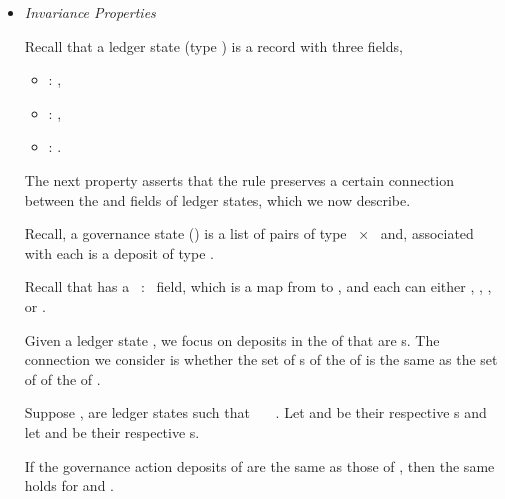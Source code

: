 \begin{itemize}
\item \textit{Invariance Properties}

        Recall that a ledger state (type \LState{}) is a record with three fields,
        \begin{itemize}
          \item[]  : \UTxOState{},
          \item[]  : \GovState{},
          \item[]  : \CertState{}.
        \end{itemize}
        The next property asserts that the  rule preserves a
        certain connection between the  and  fields of ledger
        states, which we now describe.

        Recall, a governance state (\GovState{}) is a list of pairs of type
        \GovActionID{}~×~\GovActionState{} and, associated with each
        \GovActionID{} is a deposit of type \GovActionDeposit{}.

        Recall that \UTxOState{} has a ~:~\Deposits{} field, which is a map
        from \DepositPurpose{} to \Coin{}, and each \DepositPurpose{} can either
        \CredentialDeposit{}, \PoolDeposit{}, \DRepDeposit{}, or \GovActionDeposit{}.

        Given a ledger state , we focus on deposits in the
        \UTxOState{} of  that are \GovActionDeposit{}s.  The connection we
        consider is whether the set of \GovActionDeposit{}s of the
        \UTxOState{} of  is the same as the set of \GovActionDeposit{} of the \GovState{}
        of .

  \begin{property}

  Suppose ,  are ledger states such that
   ~~~. Let 
  and  be their respective \UTxOState{}s and let 
  and  be their respective \GovState{}s.

  If the governance action deposits of  are the same as those
  of , then the same holds for  and .
  \end{property}


\end{itemize}
